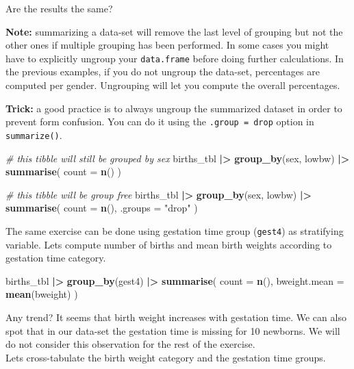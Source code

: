 \documentclass[
]{book}
\newenvironment{Shaded}{\begin{snugshade}}{\end{snugshade}}
\newcommand{\AttributeTok}[1]{\textcolor[rgb]{0.13,0.29,0.53}{#1}}
\newcommand{\CommentTok}[1]{\textcolor[rgb]{0.56,0.35,0.01}{\textit{#1}}}
\newcommand{\FunctionTok}[1]{\textcolor[rgb]{0.13,0.29,0.53}{\textbf{#1}}}
\newcommand{\NormalTok}[1]{#1}
\newcommand{\SpecialCharTok}[1]{\textcolor[rgb]{0.81,0.36,0.00}{\textbf{#1}}}
\newcommand{\StringTok}[1]{\textcolor[rgb]{0.31,0.60,0.02}{#1}}
\begin{document}
Are the results the same?

\textbf{Note:} summarizing a data-set will remove the last level of grouping but not the other ones if multiple grouping has been performed. In some cases you might have to explicitly ungroup your \texttt{data.frame} before doing further calculations.
In the previous examples, if you do not ungroup the data-set, percentages are computed per gender. Ungrouping will let you compute the overall
percentages.

\textbf{Trick:} a good practice is to always ungroup the summarized dataset in order to prevent form confusion. You can do it using the \texttt{.group\ =\ \textquotesingle{}drop\textquotesingle{}} option in \texttt{summarize()}.

\begin{Shaded}
\begin{Highlighting}[]
\CommentTok{\# this tibble will still be grouped by sex}
\NormalTok{births\_tbl }\SpecialCharTok{|\textgreater{}}
  \FunctionTok{group\_by}\NormalTok{(sex, lowbw) }\SpecialCharTok{|\textgreater{}}
  \FunctionTok{summarise}\NormalTok{(}
    \AttributeTok{count =} \FunctionTok{n}\NormalTok{()}
\NormalTok{  )}

\CommentTok{\# this tibble will be group free}
\NormalTok{births\_tbl }\SpecialCharTok{|\textgreater{}}
  \FunctionTok{group\_by}\NormalTok{(sex, lowbw) }\SpecialCharTok{|\textgreater{}}
  \FunctionTok{summarise}\NormalTok{(}
    \AttributeTok{count =} \FunctionTok{n}\NormalTok{(),}
    \AttributeTok{.groups =} \StringTok{"drop"}
\NormalTok{  )}
\end{Highlighting}
\end{Shaded}

The same exercise can be done using gestation time group (\texttt{gest4}) as stratifying variable.
Lets compute number of births and mean birth weights according to gestation time category.

\begin{Shaded}
\begin{Highlighting}[]
\NormalTok{births\_tbl }\SpecialCharTok{|\textgreater{}}
  \FunctionTok{group\_by}\NormalTok{(gest4) }\SpecialCharTok{|\textgreater{}}
  \FunctionTok{summarise}\NormalTok{(}
    \AttributeTok{count =} \FunctionTok{n}\NormalTok{(),}
    \AttributeTok{bweight.mean =} \FunctionTok{mean}\NormalTok{(bweight)}
\NormalTok{  )}
\end{Highlighting}
\end{Shaded}

Any trend?
It seems that birth weight increases with gestation time.
We can also spot that in our data-set the gestation time is missing for 10 newborns.
We will do not consider this observation for the rest of the exercise.\\
Lets cross-tabulate the birth weight category and the gestation time groups.
\end{document}
